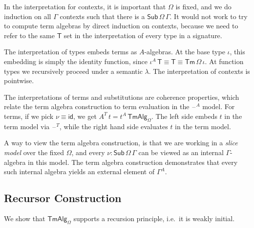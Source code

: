 \documentclass[12pt,a4paper,twoside,openany]{book}
\theoremstyle{remark}
\theoremstyle{definition}
\theoremstyle{theorem}
\newcommand{\ms}[1]{\mathsf{#1}}
\newcommand{\id}{\mathsf{id}}
\newcommand{\Sub}{\mathsf{Sub}}
\newcommand{\Tm}{\mathsf{Tm}}
\newcommand{\blank}{\mathord{\hspace{1pt}\text{--}\hspace{1pt}}}
\newcommand{\TmAlg}{\ms{TmAlg}}
\begin{document}
In the interpretation for contexts, it is important that $\Omega$ is
fixed, and we do induction on all $\Gamma$ contexts such that there is a
$\Sub\,\Omega\,\Gamma$. It would not work to try to compute term algebras by
direct induction on contexts, because we need to refer to the same $\ms{T}$ set
in the interpretation of every type in a signature.

The interpretation of types embeds terms as $A$-algebras. At the base type
$\iota$, this embedding is simply the identity function, since $\iota^A\,\ms{T}
\equiv \ms{T} \equiv \Tm\,\Omega\,\iota$. At function types we recursively proceed
under a semantic $\lambda$. The interpretation of contexts is pointwise.

The interpretations of terms and substitutions are coherence properties, which
relate the term algebra construction to term evaluation in the $\blank^A$ model.
For terms, if we pick $\nu \equiv \id$, we get $A^T\,t =
t^A\,\TmAlg_{\Omega}$. The left side embeds $t$ in the term model via
$\blank^T$, while the right hand side evaluates $t$ in the term model.

A way to view the term algebra construction, is that we are working in a
\emph{slice model} over the fixed $\Omega$, and every $\nu :
\Sub\,\Omega\,\Gamma$ can be viewed as an internal $\Gamma$-algebra in this
model. The term algebra construction demonstrates that every such internal
algebra yields an external element of $\Gamma^A$.


\subsection{Recursor Construction}
\label{sec:simple-weak-initiality}
We show that $\TmAlg_{\Omega}$ supports a recursion principle, i.e.\ it is weakly
initial.
\end{document}
